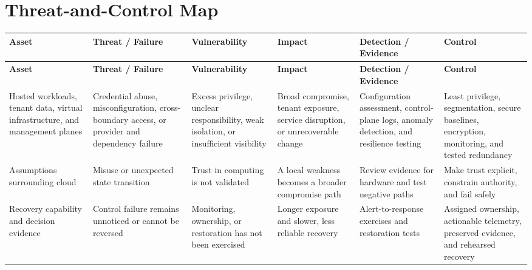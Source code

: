 \documentclass[11pt]{article}
\begin{document}
\section*{Threat-and-Control Map}
\begingroup\scriptsize\setlength{\tabcolsep}{2pt}
\begin{longtable}{>{\RaggedRight\arraybackslash}p{}>{\RaggedRight\arraybackslash}p{}>{\RaggedRight\arraybackslash}p{}>{\RaggedRight\arraybackslash}p{}>{\RaggedRight\arraybackslash}p{}>{\RaggedRight\arraybackslash}p{}}
\toprule\rowcolor{Navy}\color{white}\textbf{Asset} & \color{white}\textbf{Threat / Failure} & \color{white}\textbf{Vulnerability} & \color{white}\textbf{Impact} & \color{white}\textbf{Detection / Evidence} & \color{white}\textbf{Control}\\\midrule
\endfirsthead
\toprule\rowcolor{Navy}\color{white}\textbf{Asset} & \color{white}\textbf{Threat / Failure} & \color{white}\textbf{Vulnerability} & \color{white}\textbf{Impact} & \color{white}\textbf{Detection / Evidence} & \color{white}\textbf{Control}\\\midrule
\endhead
Hosted workloads, tenant data, virtual infrastructure, and management planes & Credential abuse, misconfiguration, cross-boundary access, or provider and dependency failure & Excess privilege, unclear responsibility, weak isolation, or insufficient visibility & Broad compromise, tenant exposure, service disruption, or unrecoverable change & Configuration assessment, control-plane logs, anomaly detection, and resilience testing & Least privilege, segmentation, secure baselines, encryption, monitoring, and tested redundancy\\\midrule
Assumptions surrounding cloud & Misuse or unexpected state transition & Trust in computing is not validated & A local weakness becomes a broader compromise path & Review evidence for hardware and test negative paths & Make trust explicit, constrain authority, and fail safely\\\midrule
Recovery capability and decision evidence & Control failure remains unnoticed or cannot be reversed & Monitoring, ownership, or restoration has not been exercised & Longer exposure and slower, less reliable recovery & Alert-to-response exercises and restoration tests & Assigned ownership, actionable telemetry, preserved evidence, and rehearsed recovery\\\midrule
\bottomrule
\end{longtable}
\endgroup
\end{document}
